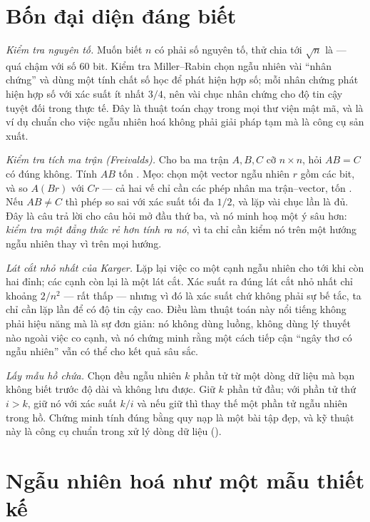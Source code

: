 \documentclass[../../algorithm.tex]{subfiles}
\begin{document}
\section{Bốn đại diện đáng biết}

\emph{Kiểm tra nguyên tố.} Muốn biết \(n\) có phải số nguyên tố, thử chia tới \(\sqrt{n}\) là  --- quá chậm với số 60 bit. Kiểm tra Miller--Rabin chọn ngẫu nhiên vài ``nhân chứng'' và dùng một tính chất số học để phát hiện hợp số; mỗi nhân chứng phát hiện hợp số với xác suất ít nhất \(3/4\), nên vài chục nhân chứng cho độ tin cậy tuyệt đối trong thực tế. Đây là thuật toán chạy trong mọi thư viện mật mã, và là ví dụ chuẩn cho việc ngẫu nhiên hoá không phải giải pháp tạm mà là công cụ sản xuất.

\emph{Kiểm tra tích ma trận (Freivalds).} Cho ba ma trận \(A, B, C\) cỡ \(n \times n\), hỏi \(AB = C\) có đúng không. Tính \(AB\) tốn . Mẹo: chọn một vector ngẫu nhiên \(r\) gồm các bit, và so \(A(Br)\) với \(Cr\) --- cả hai vế chỉ cần các phép nhân ma trận--vector, tốn . Nếu \(AB \ne C\) thì phép so sai với xác suất tối đa \(1/2\), và lặp vài chục lần là đủ. Đây là câu trả lời cho câu hỏi mở đầu thứ ba, và nó minh hoạ một ý sâu hơn: \emph{kiểm tra một đẳng thức rẻ hơn tính ra nó}, vì ta chỉ cần kiểm nó trên một hướng ngẫu nhiên thay vì trên mọi hướng.

\emph{Lát cắt nhỏ nhất của Karger.} Lặp lại việc co một cạnh ngẫu nhiên cho tới khi còn hai đỉnh; các cạnh còn lại là một lát cắt. Xác suất ra đúng lát cắt nhỏ nhất chỉ khoảng \(2/n^2\) --- rất thấp --- nhưng vì đó là xác suất chứ không phải sự bế tắc, ta chỉ cần lặp  lần để có độ tin cậy cao. Điều làm thuật toán này nổi tiếng không phải hiệu năng mà là sự đơn giản: nó không dùng luồng, không dùng lý thuyết nào ngoài việc co cạnh, và nó chứng minh rằng một cách tiếp cận ``ngây thơ có ngẫu nhiên'' vẫn có thể cho kết quả sâu sắc.

\emph{Lấy mẫu hồ chứa.} Chọn đều ngẫu nhiên \(k\) phần tử từ một dòng dữ liệu mà bạn không biết trước độ dài và không lưu được. Giữ \(k\) phần tử đầu; với phần tử thứ \(i > k\), giữ nó với xác suất \(k/i\) và nếu giữ thì thay thế một phần tử ngẫu nhiên trong hồ. Chứng minh tính đúng bằng quy nạp là một bài tập đẹp, và kỹ thuật này là công cụ chuẩn trong xử lý dòng dữ liệu ().

\section{Ngẫu nhiên hoá như một mẫu thiết kế}
\end{document}
